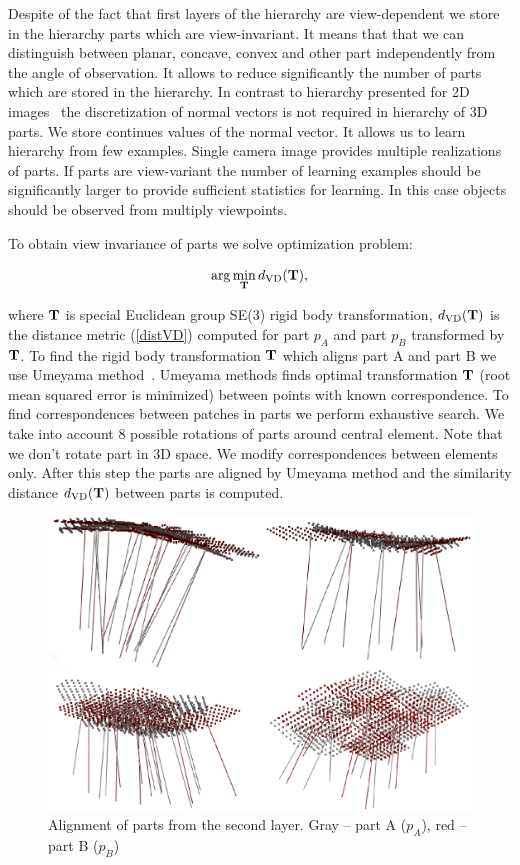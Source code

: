 \documentclass[letterpaper,10pt,conference]{ieeeconf}  %
\begin{document}
Despite of the fact that first layers of the hierarchy are view-dependent we store in the hierarchy parts which are view-invariant. It means that that we can distinguish between planar, concave, convex and other part independently from the angle of observation. It allows to reduce significantly the number of parts which are stored in the hierarchy. In contrast to hierarchy presented for 2D images~\cite{Fiedler2014} the discretization of normal vectors is not required in hierarchy of 3D parts. We store continues values of the normal vector. It allows us to learn hierarchy from few examples. Single camera image provides multiple realizations of parts. If parts are view-variant the number of learning examples should be significantly larger to provide sufficient statistics for learning. In this case objects should be observed from multiply viewpoints.

To obtain view invariance of parts we solve optimization problem:

\begin{equation}
\label{optVI}
 \arg\min_{\bf T} d_{\rm VD}({\bf T}),
\end{equation}

where ${\bf T}$ is special Euclidean group SE(3) rigid body transformation, $d_{\rm VD}({\bf T})$ is the distance metric (\ref{distVD}) computed for part $p_A$ and part $p_B$ transformed by ${\bf T}$. To find the rigid body transformation ${\bf T}$ which aligns part A and part B we use Umeyama method~\cite{Umeyama1991}. Umeyama methods finds optimal transformation ${\bf T}$ (root mean squared error is minimized) between points with known correspondence. To find correspondences between patches in parts we perform exhaustive search. We take into account 8 possible rotations of parts around central element. Note that we don't rotate part in 3D space. We modify correspondences between elements only. After this step the parts are aligned by Umeyama method and the similarity distance $d_{\rm VD}({\bf T})$ between parts is computed. 

\begin{figure}[t]
 \centering
 \includegraphics[width=0.95\columnwidth]{../images/parts2ndLayer.eps}
 \caption{Alignment of parts from the second layer. Gray -- part A ($p_A$), red -- part B ($p_B$)}
 \label{parts2ndLayer}
\end{figure}
\end{document}
